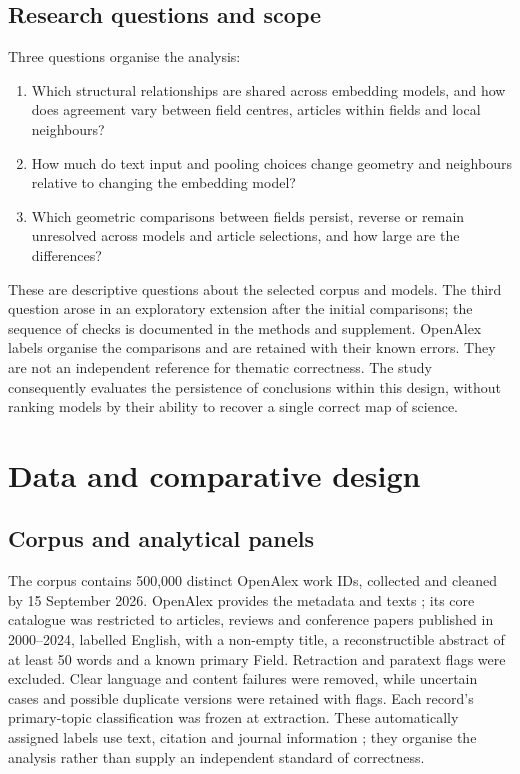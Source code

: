 \documentclass[12pt]{article}
\begin{document}
\subsection{Research questions and scope}
Three questions organise the analysis:

\begin{enumerate}
\item[\textbf{RQ1.}] Which structural relationships are shared across embedding models, and how does agreement vary between field centres, articles within fields and local neighbours?
\item[\textbf{RQ2.}] How much do text input and pooling choices change geometry and neighbours relative to changing the embedding model?
\item[\textbf{RQ3.}] Which geometric comparisons between fields persist, reverse or remain unresolved across models and article selections, and how large are the differences?
\end{enumerate}

These are descriptive questions about the selected corpus and models. The third question arose in an exploratory extension after the initial comparisons; the sequence of checks is documented in the methods and supplement. OpenAlex labels organise the comparisons and are retained with their known errors. They are not an independent reference for thematic correctness. The study consequently evaluates the persistence of conclusions within this design, without ranking models by their ability to recover a single correct map of science.


\section{Data and comparative design}
\subsection{Corpus and analytical panels}
The corpus contains 500,000 distinct OpenAlex work IDs, collected and cleaned by 15 September 2026. OpenAlex provides the metadata and texts \citep{priem2022openalex}; its core catalogue was restricted to articles, reviews and conference papers published in 2000--2024, labelled English, with a non-empty title, a reconstructible abstract of at least 50 words and a known primary Field. Retraction and paratext flags were excluded. Clear language and content failures were removed, while uncertain cases and possible duplicate versions were retained with flags. Each record's primary-topic classification was frozen at extraction. These automatically assigned labels use text, citation and journal information \citep{openalex2026topics}; they organise the analysis rather than supply an independent standard of correctness.
\end{document}
